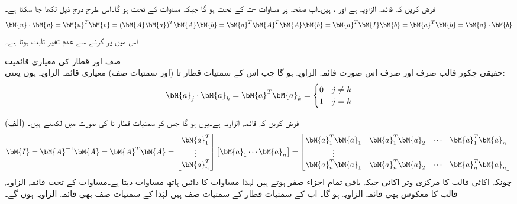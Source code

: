 فرض کریں کہ  قائمہ الزاویہ ہے اور  ،  ہیں۔اب صفحہ  پر مساوات -ت کے تحت  ہو گا جبکہ مساوات  کے تحت  ہو گا۔اس طرح درج ذیل لکھا جا سکتا ہے۔
\begin{align}
\bM{u}\cdot \bM{v}=\bM{u}^T\bM{v}=(\bM{A}\bM{a})^T\bM{A}\bM{b}=\bM{a}^T\bM{A}^T\bM{A}\bM{b}=\bM{a}^T\bM{I}\bM{b}=\bM{a}^T\bM{b}=\bM{a}\cdot\bM{b}
\end{align} 
اس میں  پر کرنے سے  عدم تغیر ثابت ہوتا ہے۔

\quad صف اور قطار کی معیاری قائمیت\\
حقیقی چکور قالب صرف اور صرف اس صورت قائمہ الزاویہ ہو گا جب اس کے سمتیات قطار  تا  (اور سمتیات صف) معیاری قائمہ الزاویہ ہوں یعنی:
\begin{align}\label{مساوات_امتیازی_معیاری_قائمیت_الف}
\bM{a}_j\cdot\bM{a}_k=\bM{a}^T\bM{a}_k=
\begin{cases}
0& j\ne k\\
1&j=k
\end{cases}
\end{align}

(الف) فرض کریں کہ  قائمہ الزاویہ ہے۔یوں  ہو گا جس کو سمتیات قطار  تا  کی صورت میں لکھتے ہیں۔
\begin{align}\label{مساوات_امتیازی_معیاری_قائمیت_ب}
\bM{I}=\bM{A}^{-1}\bM{A}=\bM{A}^T\bM{A}=\begin{bmatrix}\bM{a}_1^T\\  \vdots \\ \bM{a}_n^T  \end{bmatrix}\begin{bmatrix} \bM{a}_1 \cdots \bM{a}_n \end{bmatrix}=
\begin{bmatrix} \bM{a}_1^T\bM{a}_1&\bM{a}_1^T\bM{a}_2&\cdots&\bM{a}_1^T\bM{a}_n\\  \vdots \\ 
\bM{a}_n^T\bM{a}_1&\bM{a}_n^T\bM{a}_2&\cdots&\bM{a}_n^T\bM{a}_n \end{bmatrix}
\end{align}
چونکہ  اکائی قالب  کا مرکزی وتر اکائی جبکہ باقی تمام اجزاء صفر ہوتے ہیں لہٰذا مساوات  کا دائیں ہاتھ  مساوات  دیتا ہے۔مساوات  کے تحت قائمہ الزاویہ قالب کا معکوس بھی قائمہ الزاویہ ہو گا۔ اب  کے سمتیات قطار  کے سمتیات صف ہیں لہٰذا  کے سمتیات صف بھی قائمہ الزاویہ ہوں گے۔ 

